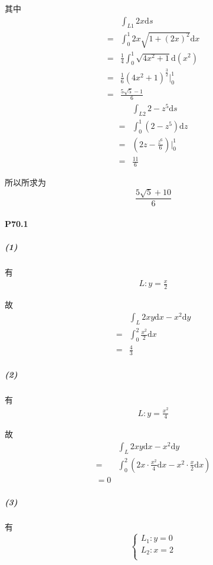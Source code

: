 \documentclass[UTF8]{ctexart}
\begin{document}
    其中
    \begin{align*}
        &\int_{L1}^{} 2x \mathrm{d}s \\
        =& \int_{0}^{1} 2x \sqrt{1+(2x)^2} \mathrm{d}x \\
        =& \frac{1}{4} \int_{0}^{1} \sqrt{4x^2+1} \mathrm{d}(x^2) \\
        =& \frac{1}{6} (4x^2+1)^{\frac{3}{2} } \big|_{0}^{1} \\
        =& \frac{5\sqrt{5}-1}{6} 
    \end{align*}
    \begin{align*}
        &\int_{L2}^{} 2-z^5 \mathrm{d}s \\
        =& \int_{0}^{1} (2-z^5)\mathrm{d}z \\
        =& (2z-\frac{z^6}{6} )\big|_{0}^{1} \\
        =&\frac{11}{6} 
    \end{align*}

    所以所求为\[
        \frac{5\sqrt{5}+10}{6} 
    \]
    \paragraph*{P70.1}
    \subparagraph*{(1)}

    有
    \begin{align*}
        L:y=\frac{x}{2} 
    \end{align*}

    故
    \begin{align*}
        &\int_{L} 2xy \mathrm{d}x - x^2 \mathrm{d}y \\
        =& \int_{0}^{2} \frac{x^2}{2} \mathrm{d}x \\
        =& \frac{4}{3} 
    \end{align*}
    \subparagraph*{(2)}
    有
    \begin{align*}
        L:y=\frac{x^2}{4} 
    \end{align*}

    故
    \begin{align*}
        &\int_{L} 2xy \mathrm{d}x - x^2 \mathrm{d}y \\
        =& \int_{0}^{2} (2x\cdot \frac{x^2}{4} \mathrm{d}x - x^2 \cdot \frac{x}{2} \mathrm{d}x) \\
        = 0
    \end{align*}
    \subparagraph*{(3)}
    有
    \begin{equation*}
        \begin{cases}
            L_1:y=0\\
            L_2:x=2\\
        \end{cases}
    \end{equation*}
\end{document}
